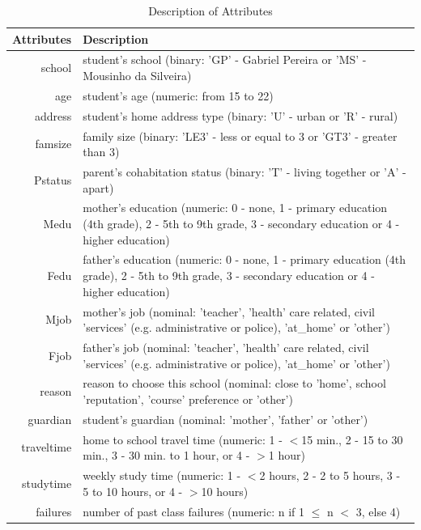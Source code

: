 \documentclass[conference]{IEEEtran}
\begin{document}

\begin{table}[!t]
\renewcommand{\arraystretch}{1.3}
\caption{Description of Attributes}
\label{table:attr-descr}
\centering
\begin{tabular}{|r | l|}
\hline
\bfseries Attributes & \bfseries Description \\
\hline
school & student's school (binary: 'GP' - Gabriel Pereira or 'MS' - Mousinho da Silveira)\\
age & student's age (numeric: from 15 to 22)\\
address & student's home address type (binary: 'U' - urban or 'R' - rural)\\
famsize & family size (binary: 'LE3' - less or equal to 3 or 'GT3' - greater than 3)\\
Pstatus & parent's cohabitation status (binary: 'T' - living together or 'A' - apart)\\
Medu & mother's education (numeric: 0 - none, 1 - primary education (4th grade), 2 - 5th to 9th grade, 3 - secondary education or 4 - higher education)\\
Fedu & father's education (numeric: 0 - none, 1 - primary education (4th grade), 2 - 5th to 9th grade, 3 - secondary education or 4 - higher education)\\
Mjob & mother's job (nominal: 'teacher', 'health' care related, civil 'services' (e.g. administrative or police), 'at\_home' or 'other')\\
Fjob & father's job (nominal: 'teacher', 'health' care related, civil 'services' (e.g. administrative or police), 'at\_home' or 'other')\\
reason & reason to choose this school (nominal: close to 'home', school 'reputation', 'course' preference or 'other')\\
guardian & student's guardian (nominal: 'mother', 'father' or 'other')\\
traveltime & home to school travel time (numeric: 1 - $<$15 min., 2 - 15 to 30 min., 3 - 30 min. to 1 hour, or 4 - $>$1 hour)\\
studytime & weekly study time (numeric: 1 - $<$2 hours, 2 - 2 to 5 hours, 3 - 5 to 10 hours, or 4 - $>$10 hours)\\
failures & number of past class failures (numeric: n if 1 $\leq$ n $<$ 3, else 4)\\

\end{tabular}
\end{table}
\end{document}
